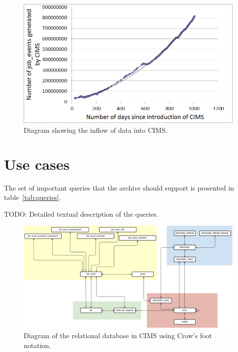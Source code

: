 \begin{figure}[h!]
\centering
\includegraphics[scale=0.65]{figure/jeTrends.png}
\caption{Diagram showing the inflow of data into CIMS.}
\label{fig:jeTrend}
\end{figure}

\section{Use cases}
The set of important queries that the archive should support is presented in table~\ref{tab:queries}.

TODO: Detailed textual description of the queries.

\begin{figure}[h!]
\centering
\includegraphics[scale=0.5, angle=90]{figure/sql.png}
\caption{Diagram of the relational database in CIMS using Crow's foot notation.}
\label{fig:sql}
\end{figure}

